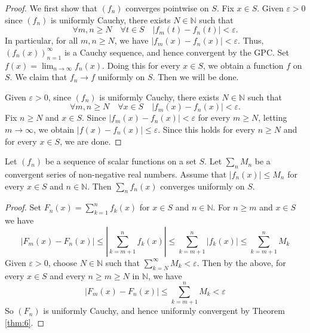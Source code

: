\documentclass[a4paper,11pt]{article}
\begin{document}
\begin{proof}
    We first show that $\left(f_{n}\right)$ converges pointwise on $S$. Fix $x \in S$. Given $\varepsilon>0$ since $\left(f_{n}\right)$ is uniformly Cauchy, there exists $N \in \mathbb{N}$ such that
    \[
    \forall m, n \geqslant N \quad \forall t \in S \quad\left|f_{m}(t)-f_{n}(t)\right|<\varepsilon.
    \]
    In particular, for all $m, n \geqslant N$, we have $\left|f_{m}(x)-f_{n}(x)\right|<\varepsilon$. Thus, $\left(f_{n}(x)\right)_{n=1}^{\infty}$ is a Cauchy sequence, and hence convergent by the GPC. Set $f(x)=\lim _{n \rightarrow \infty} f_{n}(x)$. Doing this for every $x \in S$, we obtain a function $f$ on $S$.
    We claim that $f_{n} \rightarrow f$ uniformly on $S$. Then we will be done. 
    
    Given $\varepsilon>0$, since $\left(f_{n}\right)$ is uniformly Cauchy, there exists $N \in \mathbb{N}$ such that
    \[
    \forall m, n \geqslant N \quad \forall x \in S \quad\left|f_{m}(x)-f_{n}(x)\right|<\varepsilon.
    \]
    Fix $n \geqslant N$ and $x \in S$. Since $\left|f_{m}(x)-f_{n}(x)\right|<\varepsilon$ for every $m \geqslant N$, letting $m \rightarrow \infty$, we obtain $\left|f(x)-f_{n}(x)\right| \leqslant \varepsilon$. Since this holds for every $n \geqslant N$ and for every $x \in S$, we are done.
\end{proof}
\begin{theorem}\label{thm:7}
    Let $\left(f_{n}\right)$ be a sequence of scalar functions on a set $S$. Let $\sum_{n} M_{n}$ be a convergent series of non-negative real numbers. Assume that $\left|f_{n}(x)\right| \leqslant M_{n}$ for every $x \in S$ and $n \in \mathbb{N}$. Then $\sum_{n} f_{n}(x)$ converges uniformly on $S$.
\end{theorem}
\begin{proof}
    Set $F_{n}(x)=\sum_{k=1}^{n} f_{k}(x)$ for $x \in S$ and $n \in \mathbb{N}$. For $n \geqslant m$ and $x \in S$ we have
    \[
    \left|F_{m}(x)-F_{n}(x)\right| \leqslant\left|\sum_{k=m+1}^{n} f_{k}(x)\right| \leqslant \sum_{k=m+1}^{n}\left|f_{k}(x)\right| \leqslant \sum_{k=m+1}^{n} M_{k}
    \]
    Given $\varepsilon>0$, choose $N \in \mathbb{N}$ such that $\sum_{k=N}^{\infty} M_{k}<\varepsilon$. Then by the above, for every $x \in S$ and every $n \geqslant m \geqslant N$ in $\mathbb{N}$, we have
    \[
    \left|F_{m}(x)-F_{n}(x)\right| \leqslant \sum_{k=m+1}^{n} M_{k}<\varepsilon
    \]
    So $\left(F_{n}\right)$ is uniformly Cauchy, and hence uniformly convergent by Theorem \ref{thm:6}.
\end{proof}
\end{document}
